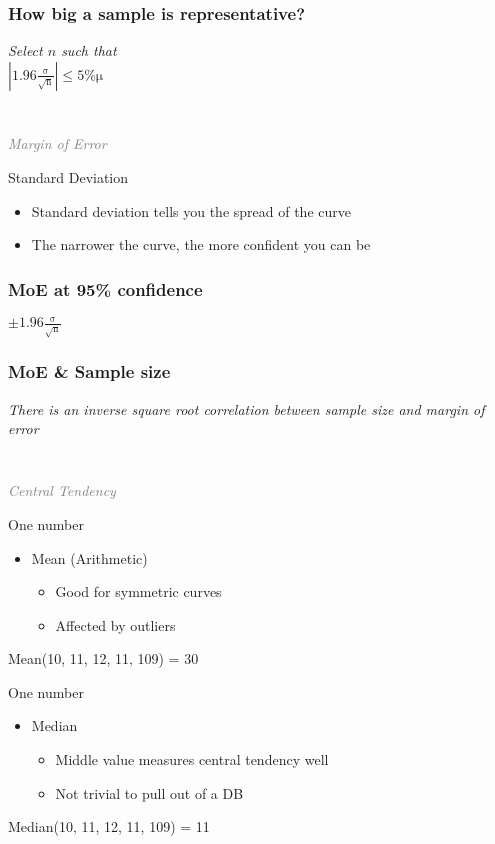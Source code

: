 \documentclass{beamer}
\newcommand{\innersplash}[1]{
  \begin{center}
    \large \textrm{\textit{ #1 } }
  \end{center}
}
\newcommand{\splashslide}[2][{}]{
  \begin{frame}
  \frametitle{#1}
  \innersplash{#2}
  \end{frame}
}
\newcommand{\leadinslide}[2]{
  \splashslide{
     {\fontsize{150}{20}\selectfont{\raisebox{0pt}[90pt][0pt]{\textcolor{light-gray}{#1}}}} \\ \huge \textcolor{gray}{#2}
  }
}
\begin{document}
\splashslide[How big a sample is representative?]{Select \(n\) such that \\ \medskip \LARGE \( \mathrm{\left| 1.96\frac{\sigma}{\sqrt{n}} \right| \le 5\% \mu} \)}

\leadinslide{1-2}{Margin of Error}

\begin{frame}{Standard Deviation}
  \begin{itemize}
  \item Standard deviation tells you the spread of the curve
  \item The narrower the curve, the more confident you can be
  \end{itemize}
  \parbox[c][0.58\paperheight]{\paperwidth}{ }
\end{frame}


\splashslide[MoE at 95\% confidence]{ \Huge \( \mathrm{\pm 1.96\frac{\sigma}{\sqrt{n}}} \) }

\splashslide[MoE \& Sample size]{There is an inverse square root correlation between sample size and margin of error}

\leadinslide{1-3}{Central Tendency}

\begin{frame}
\end{frame}

\begin{frame}{One number}
  \begin{itemize}
  \item Mean (Arithmetic)
    \begin{itemize}
    \item Good for symmetric curves
    \item Affected by outliers
    \end{itemize}
  \end{itemize}
  \begin{center}
  \Large{ Mean(10, 11, 12, 11, 109) = 30 }
  \end{center}
\end{frame}

\begin{frame}{One number}
  \begin{itemize}
  \item Median
    \begin{itemize}
    \item Middle value measures central tendency well
    \item Not trivial to pull out of a DB
    \end{itemize}
  \end{itemize}
  \begin{center}
  \Large{ Median(10, 11, 12, 11, 109) = 11 }
  \end{center}
\end{frame}
\end{document}
